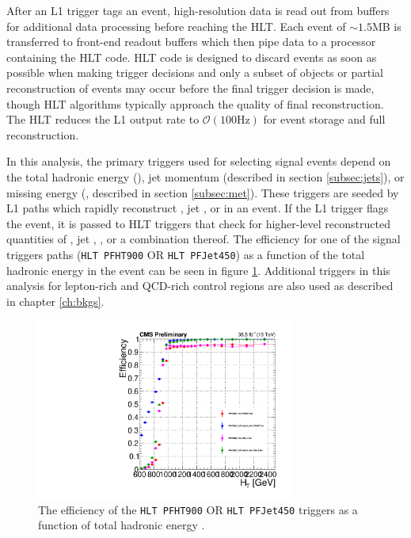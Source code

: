 After an L1 trigger tags an event, high-resolution data is read out from buffers for additional data processing before reaching the HLT. Each event of $\sim1.5$MB is transferred to front-end readout buffers which then pipe data to a processor containing the HLT code. HLT code is designed to discard events as soon as possible when making trigger decisions and only a subset of objects or partial reconstruction of events may occur before the final trigger decision is made, though HLT algorithms typically approach the quality of final reconstruction. The HLT reduces the L1 output rate to $\mathcal{O}(100\text{Hz})$ for event storage and full reconstruction.

In this analysis, the primary triggers used for selecting signal events depend on the total hadronic energy (\HT), jet momentum (described in section \ref{subsec:jets}), or missing energy (\MET, described in section \ref{subsec:met}). These triggers are seeded by L1 paths which rapidly reconstruct \HT, jet \pt, or \MET in an event. If the L1 trigger flags the event, it is passed to HLT triggers that check for higher-level reconstructed quantities of  \HT, jet \pt,  \MET, or a combination thereof. The efficiency for one of the signal triggers paths (\texttt{HLT PFHT900} OR \texttt{HLT PFJet450}) as a function of the total hadronic energy in the event can be seen in figure \ref{fig:triggerTurnon}. Additional triggers in this analysis for lepton-rich and QCD-rich control regions are also used as described in chapter \ref{ch:bkgs}.

 \begin{figure}
	\centering
	\includegraphics[width=0.75\textwidth]{detector/figs/trigeff_PFHT900_PFJet450_36p5fb}
	\renewcommand{\baselinestretch}{1.0}
	\caption[The efficiency of the \texttt{HLT PFHT900} OR \texttt{HLT PFJet450} triggers as a function of total hadronic energy \HT.]{The efficiency of the \texttt{HLT PFHT900} OR \texttt{HLT PFJet450} triggers as a function of total hadronic energy \HT.}
	\label{fig:triggerTurnon}
\end{figure}

